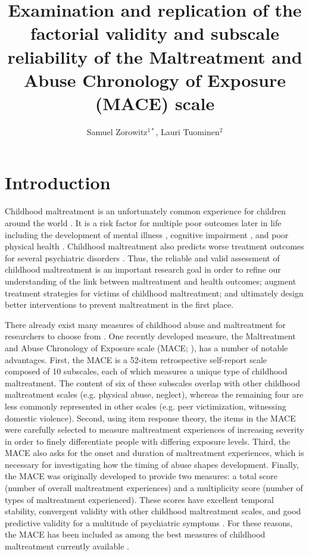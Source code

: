 \documentclass[letterpaper,man,natbib,noextraspace,floatsintext,longtable,12pt]{apa6}
\title{Examination and replication of the factorial validity and subscale reliability of the Maltreatment and Abuse Chronology of Exposure (MACE) scale}
\author{Samuel Zorowitz$^{1*}$, Lauri Tuominen$^{2}$}
\affiliation{$^1$Princeton Neuroscience Institute, Princeton University, USA\\$^2$The Royal’s Institute of Mental Health Research, University of Ottawa, Canada}
\begin{document}
\maketitle

\section{Introduction}

Childhood maltreatment is an unfortunately common experience for children around the world \citep{stoltenborgh2015prevalence}. It is a risk factor for multiple poor outcomes later in life including the development of mental illness \citep{kessler2010childhood}, cognitive impairment \citep{su2019does}, and poor physical health \citep{wegman2009meta}. Childhood maltreatment also predicts worse treatment outcomes for several psychiatric disorders \citep{nanni2012childhood, thomas2019childhood}. Thus, the reliable and valid assessment of childhood maltreatment is an important research goal in order to refine our understanding of the link between maltreatment and health outcomes; augment treatment strategies for victims of childhood maltreatment; and ultimately design better interventions to prevent maltreatment in the first place. 

There already exist many measures of childhood abuse and maltreatment for researchers to choose from \citep{saini2019systematic}. One recently developed measure, the Maltreatment and Abuse Chronology of Exposure scale (MACE; \citealt{teicher2015maltreatment}), has a number of notable advantages. First, the MACE is a 52-item retrospective self-report scale composed of 10 subscales, each of which measures a unique type of childhood maltreatment. The content of six of these subscales overlap with other childhood maltreatment scales (e.g. physical abuse, neglect), whereas the remaining four are less commonly represented in other scales (e.g. peer victimization, witnessing domestic violence). Second, using item response theory, the items in the MACE were carefully selected to measure maltreatment experiences of increasing severity in order to finely differentiate people with differing exposure levels. Third, the MACE also asks for the onset and duration of maltreatment experiences, which is necessary for investigating how the timing of abuse shapes development. Finally, the MACE was originally developed to provide two measures: a total score (number of overall maltreatment experiences) and a multiplicity score (number of types of maltreatment experienced). These scores have excellent temporal stability, convergent validity with other childhood maltreatment scales, and good predictive validity for a multitude of psychiatric symptoms \citep{teicher2015maltreatment}. For these reasons, the MACE has been included as among the best measures of childhood maltreatment currently available \citep{saini2019systematic, georgieva2022systematic}.
\end{document}
